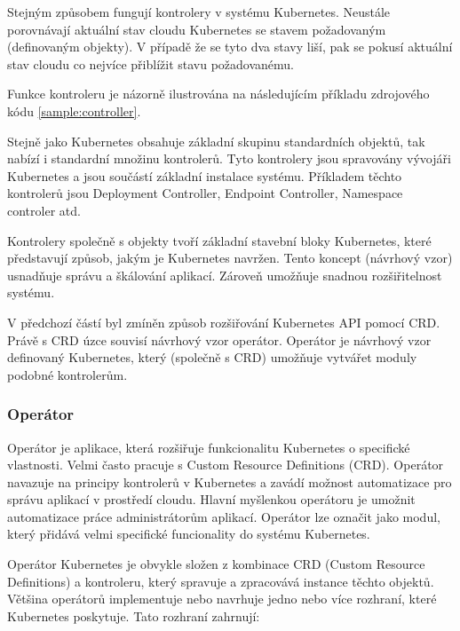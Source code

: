 Stejným způsobem fungují kontrolery v systému Kubernetes. Neustále porovnávají aktuální stav cloudu Kubernetes se stavem požadovaným (definovaným objekty). V případě že se tyto dva stavy liší, pak se pokusí aktuální stav cloudu co nejvíce přiblížit stavu požadovanému.

Funkce kontroleru je názorně ilustrována na následujícím příkladu zdrojového kódu \ref{sample:controller}. \cite{nguyen_2017_a}


Stejně jako Kubernetes obsahuje základní skupinu standardních objektů, tak nabízí i standardní množinu kontrolerů. Tyto kontrolery jsou spravovány vývojáři Kubernetes a jsou součástí základní instalace systému. Příkladem těchto kontrolerů jsou Deployment Controller, Endpoint Controller, Namespace controler atd. 

Kontrolery společně s objekty tvoří základní stavební bloky Kubernetes, které představují způsob, jakým je Kubernetes navržen. Tento koncept (návrhový vzor) usnadňuje správu a škálování aplikací. Zároveň umožňuje snadnou rozšiřitelnost systému.

V předchozí částí byl zmíněn způsob rozšiřování Kubernetes API pomocí CRD. Právě s CRD úzce souvisí návrhový vzor operátor. Operátor je návrhový vzor definovaný Kubernetes, který (společně s CRD) umožňuje vytvářet moduly podobné kontrolerům. 
\subsubsection{Operátor}
Operátor je aplikace, která rozšiřuje funkcionalitu Kubernetes o specifické vlastnosti. Velmi často pracuje s Custom Resource Definitions (CRD). Operátor navazuje na principy kontrolerů v Kubernetes a zavádí možnost automatizace pro správu aplikací v prostředí cloudu. Hlavní myšlenkou operátoru je umožnit automatizace práce administrátorům aplikací. Operátor lze označit jako modul, který přidává velmi specifické funcionality do systému Kubernetes. 

Operátor Kubernetes je obvykle složen z kombinace CRD (Custom Resource Definitions) a kontroleru, který spravuje a zpracovává instance těchto objektů. Většina operátorů implementuje nebo navrhuje jedno nebo více rozhraní, které Kubernetes poskytuje. Tato rozhraní zahrnují:
  
